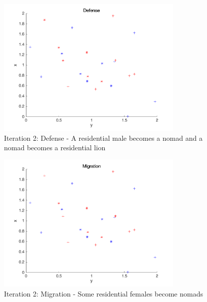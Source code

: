 \begin{figure}[H]
\begin{center}
\includegraphics[width=0.8\textwidth]{img/mdme/defense2}
\caption{Iteration 2: Defense - A residential male becomes a nomad and a nomad becomes a residential lion}
\end{center}
\end{figure}

\begin{figure}[H]
\begin{center}
\includegraphics[width=0.8\textwidth]{img/mdme/migration2}
\caption{Iteration 2: Migration - Some residential females become nomads}
\end{center}
\end{figure}


